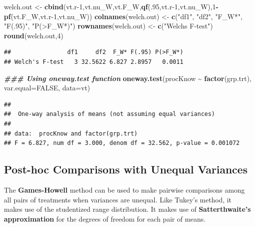 \documentclass[
]{book}
\newenvironment{Shaded}{\begin{snugshade}}{\end{snugshade}}
\newcommand{\AttributeTok}[1]{\textcolor[rgb]{0.13,0.29,0.53}{#1}}
\newcommand{\ConstantTok}[1]{\textcolor[rgb]{0.56,0.35,0.01}{#1}}
\newcommand{\DecValTok}[1]{\textcolor[rgb]{0.00,0.00,0.81}{#1}}
\newcommand{\DocumentationTok}[1]{\textcolor[rgb]{0.56,0.35,0.01}{\textbf{\textit{#1}}}}
\newcommand{\FunctionTok}[1]{\textcolor[rgb]{0.13,0.29,0.53}{\textbf{#1}}}
\newcommand{\NormalTok}[1]{#1}
\newcommand{\OtherTok}[1]{\textcolor[rgb]{0.56,0.35,0.01}{#1}}
\newcommand{\SpecialCharTok}[1]{\textcolor[rgb]{0.81,0.36,0.00}{\textbf{#1}}}
\newcommand{\StringTok}[1]{\textcolor[rgb]{0.31,0.60,0.02}{#1}}
\begin{document}
\begin{Shaded}
\begin{Highlighting}[]
\NormalTok{welch.out }\OtherTok{\textless{}{-}} \FunctionTok{cbind}\NormalTok{(vt.r}\DecValTok{{-}1}\NormalTok{,vt.nu\_W,vt.F\_W,}\FunctionTok{qf}\NormalTok{(.}\DecValTok{95}\NormalTok{,vt.r}\DecValTok{{-}1}\NormalTok{,vt.nu\_W),}\DecValTok{1}\SpecialCharTok{{-}}\FunctionTok{pf}\NormalTok{(vt.F\_W,vt.r}\DecValTok{{-}1}\NormalTok{,vt.nu\_W))}
\FunctionTok{colnames}\NormalTok{(welch.out) }\OtherTok{\textless{}{-}} \FunctionTok{c}\NormalTok{(}\StringTok{"df1"}\NormalTok{, }\StringTok{"df2"}\NormalTok{, }\StringTok{"F\_W*"}\NormalTok{, }\StringTok{"F(.95)"}\NormalTok{, }\StringTok{"P(\textgreater{}F\_W*)"}\NormalTok{)}
\FunctionTok{rownames}\NormalTok{(welch.out) }\OtherTok{\textless{}{-}} \FunctionTok{c}\NormalTok{(}\StringTok{"Welch\textquotesingle{}s F{-}test"}\NormalTok{)}
\FunctionTok{round}\NormalTok{(welch.out,}\DecValTok{4}\NormalTok{)}
\end{Highlighting}
\end{Shaded}

\begin{verbatim}
##                df1     df2  F_W* F(.95) P(>F_W*)
## Welch's F-test   3 32.5622 6.827 2.8957   0.0011
\end{verbatim}

\begin{Shaded}
\begin{Highlighting}[]
\DocumentationTok{\#\#\# Using oneway.test function}
\FunctionTok{oneway.test}\NormalTok{(procKnow }\SpecialCharTok{\textasciitilde{}} \FunctionTok{factor}\NormalTok{(grp.trt), }\AttributeTok{var.equal=}\ConstantTok{FALSE}\NormalTok{, }\AttributeTok{data=}\NormalTok{vt)}
\end{Highlighting}
\end{Shaded}

\begin{verbatim}
## 
##  One-way analysis of means (not assuming equal variances)
## 
## data:  procKnow and factor(grp.trt)
## F = 6.827, num df = 3.000, denom df = 32.562, p-value = 0.001072
\end{verbatim}

\subsection{Post-hoc Comparisons with Unequal
Variances}\label{post-hoc-comparisons-with-unequal-variances}

The \textbf{Games-Howell} method can be used to make pairwise
comparisons among all pairs of treatments when variances are unequal.
Like Tukey's method, it makes use of the studentized range distribution.
It makes use of \textbf{Satterthwaite's approximation} for the degrees
of freedom for each pair of means.
\end{document}
